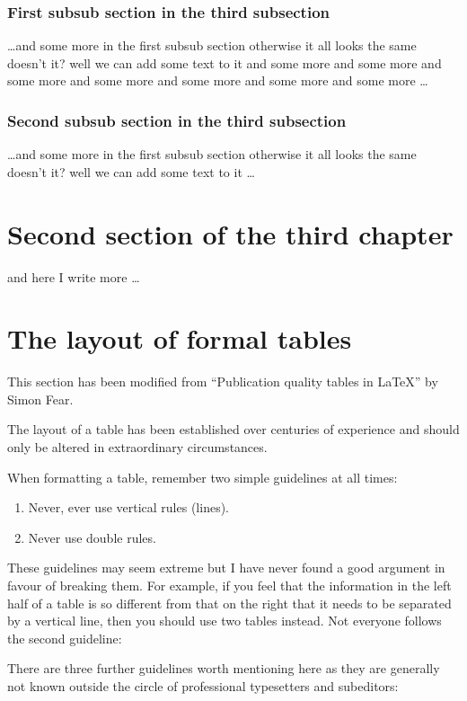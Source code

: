 \subsubsection{First subsub section in the third subsection}
\dots and some more in the first subsub section otherwise it all looks the same
doesn't it? well we can add some text to it and some more and some more and
some more and some more and some more and some more and some more \dots

\subsubsection{Second subsub section in the third subsection}
\dots and some more in the first subsub section otherwise it all looks the same
doesn't it? well we can add some text to it \dots

\section{Second section of the third chapter}
and here I write more \dots

\section{The layout of formal tables}
This section has been modified from ``Publication quality tables in \LaTeX*''
 by Simon Fear.

The layout of a table has been established over centuries of experience and 
should only be altered in extraordinary circumstances. 

When formatting a table, remember two simple guidelines at all times:

\begin{enumerate}
  \item Never, ever use vertical rules (lines).
  \item Never use double rules.
\end{enumerate}

These guidelines may seem extreme but I have
never found a good argument in favour of breaking them. For
example, if you feel that the information in the left half of
a table is so different from that on the right that it needs
to be separated by a vertical line, then you should use two
tables instead. Not everyone follows the second guideline:

There are three further guidelines worth mentioning here as they
are generally not known outside the circle of professional
typesetters and subeditors:

